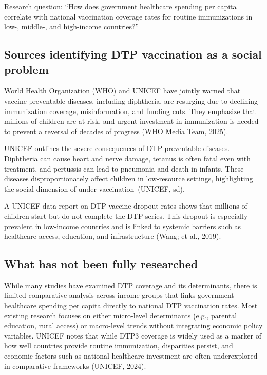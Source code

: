 \documentclass[
]{article}
\begin{document}
Research question: ``How does government healthcare spending per capita
correlate with national vaccination coverage rates for routine
immunizations in low-, middle-, and high-income countries?''

\subsection{Sources identifying DTP vaccination as a social
problem}\label{sources-identifying-dtp-vaccination-as-a-social-problem}

World Health Organization (WHO) and UNICEF have jointly warned that
vaccine-preventable diseases, including diphtheria, are resurging due to
declining immunization coverage, misinformation, and funding cuts. They
emphasize that millions of children are at risk, and urgent investment
in immunization is needed to prevent a reversal of decades of progress
(WHO Media Team, 2025).

UNICEF outlines the severe consequences of DTP-preventable diseases.
Diphtheria can cause heart and nerve damage, tetanus is often fatal even
with treatment, and pertussis can lead to pneumonia and death in
infants. These diseases disproportionately affect children in
low-resource settings, highlighting the social dimension of
under-vaccination~(UNICEF, sd).

A UNICEF data report on DTP vaccine dropout rates shows that millions of
children start but do not complete the DTP series. This dropout is
especially prevalent in low-income countries and is linked to systemic
barriers such as healthcare access, education, and infrastructure (Wang;
et al., 2019).

\subsection{What has not been fully
researched}\label{what-has-not-been-fully-researched}

While many studies have examined DTP coverage and its determinants,
there is limited comparative analysis across income groups that links
government healthcare spending per capita directly to national DTP
vaccination rates. Most existing research focuses on either micro-level
determinants (e.g., parental education, rural access) or macro-level
trends without integrating economic policy variables. UNICEF notes that
while DTP3 coverage is widely used as a marker of how well countries
provide routine immunization, disparities persist, and economic factors
such as national healthcare investment are often underexplored in
comparative frameworks (UNICEF, 2024).
\end{document}
